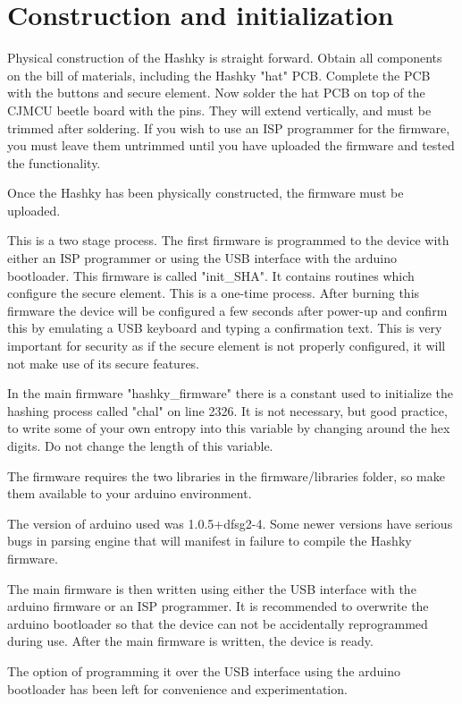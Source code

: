 \documentclass{article}
\begin{document}
\section{Construction and initialization}

Physical construction of the Hashky is straight forward. Obtain all components on the bill of materials, including the Hashky "hat" PCB. Complete the PCB with the buttons and secure element. Now solder the hat PCB on top of the CJMCU beetle board with the pins. They will extend vertically, and must be trimmed after soldering. If you wish to use an ISP programmer for the firmware, you must leave them untrimmed until you have uploaded the firmware and tested the functionality. 

Once the Hashky has been physically constructed, the firmware must be uploaded. 

This is a two stage process. The first firmware is programmed to the device with either an ISP programmer or using the USB interface with the arduino bootloader. This firmware is called "init\_SHA". It contains routines which configure the secure element. This is a one-time process. After burning this firmware the device will be configured a few seconds after power-up and confirm this by emulating a USB keyboard and typing a confirmation text. This is very important for security as if the secure element is not properly configured, it will not make use of its secure features. 

In the main firmware "hashky\_firmware" there is a constant used to initialize the hashing process called "chal" on line 2326. It is not necessary, but good practice, to write some of your own entropy into this variable by changing around the hex digits.  Do not change the length of this variable. 

The firmware requires the two libraries in the firmware/libraries folder, so make them available to your arduino environment. 

The version of arduino used was 1.0.5+dfsg2-4. Some newer versions have serious bugs in parsing engine that will manifest in failure to compile the Hashky firmware. 

The main firmware is then written using either the USB interface with the arduino firmware or an ISP programmer. It is recommended to overwrite the arduino bootloader so that the device can not be accidentally reprogrammed during use. After the main firmware is written, the device is ready. 

The option of programming it over the USB interface using the arduino bootloader has been left for convenience and experimentation. 
\end{document}
